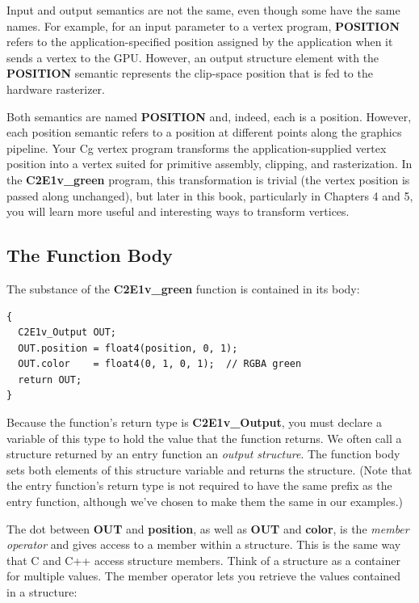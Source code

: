 \documentclass{book}
\begin{document}
Input and output semantics are not the same, even though some have the same names. For example, for an input parameter to a vertex program, \textbf{POSITION} refers to the application-specified position assigned by the application when it sends a vertex to the GPU. However, an output structure element with the \textbf{POSITION} semantic represents the clip-space position that is fed to the hardware rasterizer.

Both semantics are named \textbf{POSITION} and, indeed, each is a position. However, each position semantic refers to a position at different points along the graphics pipeline. Your Cg vertex program transforms the application-supplied vertex position into a vertex suited for primitive assembly, clipping, and rasterization. In the \textbf{C2E1v\_green} program, this transformation is trivial (the vertex position is passed along unchanged), but later in this book, particularly in Chapters 4 and 5, you will learn more useful and interesting ways to transform vertices.

\subsection{The Function Body}

The substance of the \textbf{C2E1v\_green} function is contained in its body:

\FloatBarrier
\begin{lstlisting}
{
  C2E1v_Output OUT;
  OUT.position = float4(position, 0, 1);
  OUT.color    = float4(0, 1, 0, 1);  // RGBA green
  return OUT;
}
\end{lstlisting}
\FloatBarrier

Because the function's return type is \textbf{C2E1v\_Output}, you must declare a variable of this type to hold the value that the function returns. We often call a structure returned by an entry function an \textit{output structure}. The function body sets both elements of this structure variable and returns the structure. (Note that the entry function's return type is not required to have the same prefix as the entry function, although we've chosen to make them the same in our examples.)

The dot between \textbf{OUT} and \textbf{position}, as well as \textbf{OUT} and \textbf{color}, is the \textit{member operator} and gives access to a member within a structure. This is the same way that C and C++ access structure members. Think of a structure as a container for multiple values. The member operator lets you retrieve the values contained in a structure:
\end{document}
